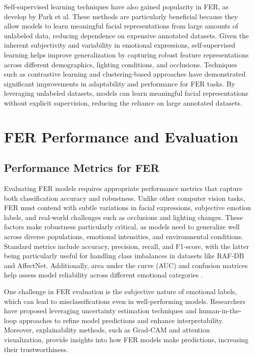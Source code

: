 Self-supervised learning techniques have also gained popularity in FER, as develop by Park et al\cite{park_what_2023}. These methods are particularly beneficial because they allow models to learn meaningful facial representations from large amounts of unlabeled data, reducing dependence on expensive annotated datasets. Given the inherent subjectivity and variability in emotional expressions, self-supervised learning helps improve generalization by capturing robust feature representations across different demographics, lighting conditions, and occlusions. Techniques such as contrastive learning and clustering-based approaches have demonstrated significant improvements in adaptability and performance for FER tasks. By leveraging unlabeled datasets, models can learn meaningful facial representations without explicit supervision, reducing the reliance on large annotated datasets. 



\section{FER Performance and Evaluation}


\subsection{Performance Metrics for FER}

Evaluating FER models requires appropriate performance metrics that capture both classification accuracy and robustness. Unlike other computer vision tasks, FER must contend with subtle variations in facial expressions, subjective emotion labels, and real-world challenges such as occlusions and lighting changes. These factors make robustness particularly critical, as models need to generalize well across diverse populations, emotional intensities, and environmental conditions. Standard metrics include accuracy, precision, recall, and F1-score, with the latter being particularly useful for handling class imbalances in datasets like RAF-DB and AffectNet. Additionally, area under the curve (AUC) and confusion matrices help assess model reliability across different emotional categories \cite{ma_facial_2023}.

One challenge in FER evaluation is the subjective nature of emotional labels, which can lead to misclassifications even in well-performing models. Researchers have proposed leveraging uncertainty estimation techniques and human-in-the-loop approaches to refine model predictions and enhance interpretability. Moreover, explainability methods, such as Grad-CAM and attention visualization, provide insights into how FER models make predictions, increasing their trustworthiness.

